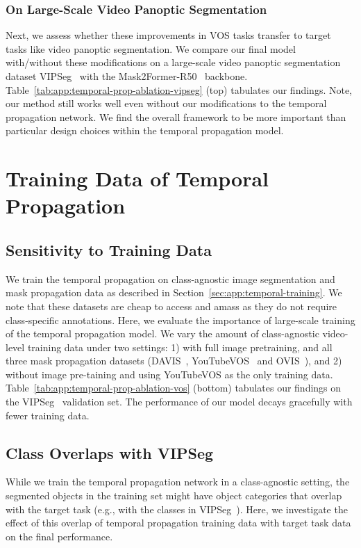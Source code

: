 \subsubsection{On Large-Scale Video Panoptic Segmentation}\label{sec:app:vps-ablation}
Next, we assess whether these improvements in VOS tasks transfer to target tasks like video panoptic segmentation.
We compare our final model with/without these modifications on a large-scale video panoptic segmentation dataset VIPSeg~\cite{miao2022large} with the Mask2Former-R50~\cite{cheng2022masked} backbone. 
Table~\ref{tab:app:temporal-prop-ablation-vipseg} (top) tabulates our findings.
Note, our method still works well even without our modifications to the temporal propagation network. 
We find the overall framework to be more important than particular design choices within the temporal propagation model.

\section{Training Data of Temporal Propagation}\label{sec:app:temporal-training-data}

\subsection{Sensitivity to Training Data}
We train the temporal propagation on class-agnostic image segmentation and mask propagation data as described in Section~\ref{sec:app:temporal-training}.
We note that these datasets are cheap to access and amass as they do not require class-specific annotations. 
Here, we evaluate the importance of large-scale training of the temporal propagation model.
We vary the amount of class-agnostic video-level training data under two settings: 1) with full image pretraining, and all three mask propagation datasets (DAVIS~\cite{perazzi2016benchmark}, YouTubeVOS~\cite{xu2018youtubeVOS} and OVIS~\cite{qi2022occluded}), and 2) without image pre-taining and using YouTubeVOS as the only training data.
Table~\ref{tab:app:temporal-prop-ablation-vos} (bottom) tabulates our findings on the VIPSeg~\cite{miao2022large} validation set. 
The performance of our model decays gracefully with fewer training data.

\subsection{Class Overlaps with VIPSeg}
While we train the temporal propagation network in a class-agnostic setting, the segmented objects in the training set might have object categories that overlap with the target task (e.g., with the classes in VIPSeg~\cite{miao2022large}).
Here, we investigate the effect of this overlap of temporal propagation training data with target task data on the final performance.

